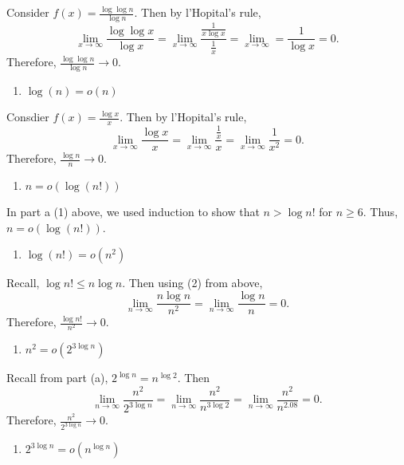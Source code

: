 \documentclass[12pt,]{article}
\providecommand{\tightlist}{%
  \setlength{\itemsep}{0pt}\setlength{\parskip}{0pt}}
\begin{document}
Consider \(f(x) = \frac{\log\log n}{\log n}.\) Then by l'Hopital's rule,
\[\lim_{x\rightarrow\infty}\frac{\log\log x}{\log x} = \lim_{x\rightarrow\infty}\frac{\frac{1}{x\log x}}{\frac{1}{x}}=\lim_{x\rightarrow\infty}=\frac{1}{\log x}=0.\]
Therefore, \(\frac{\log\log n}{\log n}\rightarrow 0.\)

\begin{enumerate}
\def\labelenumi{(\arabic{enumi})}
\setcounter{enumi}{1}
\tightlist
\item
  \(\log(n)= o\left( n \right)\)
\end{enumerate}

Consdier \(f(x) = \frac{\log x}{x}.\) Then by l'Hopital's rule,
\[\lim_{x\rightarrow\infty}\frac{\log x}{x} = \lim_{x\rightarrow\infty}\frac{\frac{1}{x}}{x} = \lim_{x\rightarrow\infty}\frac{1}{x^2} = 0.\]
Therefore, \(\frac{\log n}{n}\rightarrow 0.\)

\begin{enumerate}
\def\labelenumi{(\arabic{enumi})}
\setcounter{enumi}{2}
\tightlist
\item
  \(n = o\left( \log(n!)\right)\)
\end{enumerate}

In part a (1) above, we used induction to show that \(n>\log n!\) for
\(n\ge 6\). Thus, \(n = o\left( \log(n!)\right)\).

\begin{enumerate}
\def\labelenumi{(\arabic{enumi})}
\setcounter{enumi}{3}
\tightlist
\item
  \(\log(n!)= o\left( n^2 \right)\)
\end{enumerate}

Recall, \(\log n! \le n \log n.\) Then using (2) from above,
\[\lim_{n\rightarrow\infty} \frac{n\log n}{n^2} = \lim_{n\rightarrow\infty}\frac{\log n}{n} =0.\]
Therefore, \(\frac{\log n!}{n^2}\rightarrow 0.\)

\begin{enumerate}
\def\labelenumi{(\arabic{enumi})}
\setcounter{enumi}{4}
\tightlist
\item
  \(n^2= o\left( 2^{3\log n}\right)\)
\end{enumerate}

Recall from part (a), \(2^{\log n} = n^{\log 2}.\) Then
\[\lim_{n \rightarrow \infty} \frac{n^2}{2^{3\log n}} = \lim_{n \rightarrow \infty} \frac{n^2}{n^{3\log 2}}=\lim_{n \rightarrow \infty} \frac{n^2}{n^{2.08}}=0.\]
Therefore, \(\frac{n^2}{2^{3\log n}}\rightarrow 0\).

\begin{enumerate}
\def\labelenumi{(\arabic{enumi})}
\setcounter{enumi}{5}
\tightlist
\item
  \(2^{3\log n}= o\left( n^{\log n}\right)\)
\end{enumerate}
\end{document}
